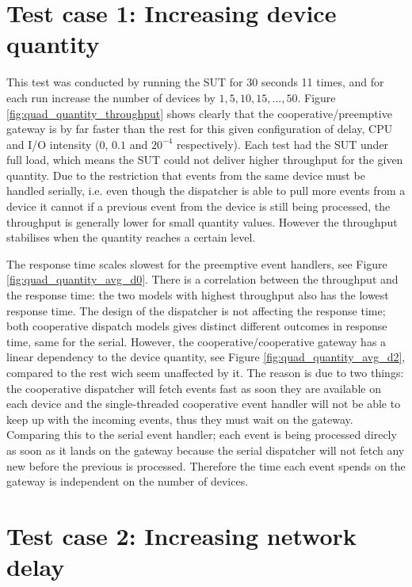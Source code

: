 \clearpage

\section{Test case 1: Increasing device quantity}

This test was conducted by running the SUT for 30 seconds 11 times, and for
each run increase the number of devices by $1, 5, 10, 15, ..., 50$. Figure
\ref{fig:quad_quantity_throughput} shows clearly that the
cooperative/preemptive gateway is by far faster than the rest for this given
configuration of delay, CPU and I/O intensity (0, $0.1$ and $20^{-4}$
respectively). Each test had the SUT under full load, which means the SUT could
not deliver higher throughput for the given quantity. Due to the restriction
that events from the same device must be handled serially, i.e. even though the
dispatcher is able to pull more events from a device it cannot if a previous
event from the device is still being processed, the throughput is generally
lower for small quantity values. However the throughput stabilises when the
quantity reaches a certain level.

The response time scales slowest for the preemptive event handlers, see Figure
\ref{fig:quad_quantity_avg_d0}. There is a correlation between the throughput
and the response time: the two models with highest throughput also has the
lowest response time. The design of the dispatcher is not affecting the
response time; both cooperative dispatch models gives distinct different
outcomes in response time, same for the serial. However, the
cooperative/cooperative gateway has a linear dependency to the device quantity,
see Figure \ref{fig:quad_quantity_avg_d2}, compared to the rest wich seem
unaffected by it. The reason is due to two things: the cooperative dispatcher
will fetch events fast as soon they are available on each device and the
single-threaded cooperative event handler will not be able to keep up with the
incoming events, thus they must wait on the gateway. Comparing this to the
serial event handler; each event is being processed direcly as soon as it lands
on the gateway because the serial dispatcher will not fetch any new before the
previous is processed. Therefore the time each event spends on the gateway is
independent on the number of devices.


\section{Test case 2: Increasing network delay}


